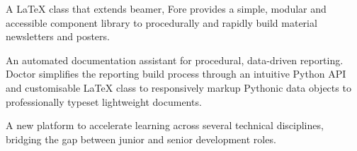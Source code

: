 \begin{Page}
\begin{Slides}
		A \LaTeX{} class that extends beamer, Fore provides a simple, modular and accessible component library to procedurally and rapidly build material newsletters and posters.%
		
		\Spacer[height=\nlmargin]%
		
		\Author[%
			name={Automating data-driven reports},
			team={Elliott Phillips, Data Scientist},
			image=img/ep.jpg,
			image width=1,
		]
		
		An automated documentation assistant for procedural, data-driven reporting. Doctor simplifies the reporting build process through an intuitive Python API and customisable \LaTeX{} class to responsively markup Pythonic data objects to professionally typeset lightweight documents.%
		
		\Spacer[height=\nlmargin]%
		
		\Author[%
			name={ons.dev},
			team={Elliott Phillips, Data Scientist},
			image=img/ep.jpg,
			image width=1,
		]%
		
		A new platform to accelerate learning across several technical disciplines, bridging the gap between junior and senior development roles.%
	\end{Slides}
\end{Page}